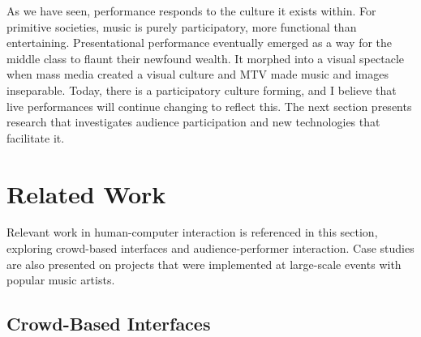 
As we have seen, performance responds to the culture it exists within. For primitive societies, music is purely participatory, more functional than entertaining. Presentational performance eventually emerged as a way for the middle class to flaunt their newfound wealth. It morphed into a visual spectacle when mass media created a visual culture and MTV made music and images inseparable. Today, there is a participatory culture forming, and I believe that live performances will continue changing to reflect this. The next section presents research that investigates audience participation and new technologies that facilitate it.


\section{Related Work}

Relevant work in human-computer interaction is referenced in this section, exploring crowd-based interfaces and audience-performer interaction. Case studies are also presented on projects that were implemented at large-scale events with popular music artists.

\subsection{Crowd-Based Interfaces}

